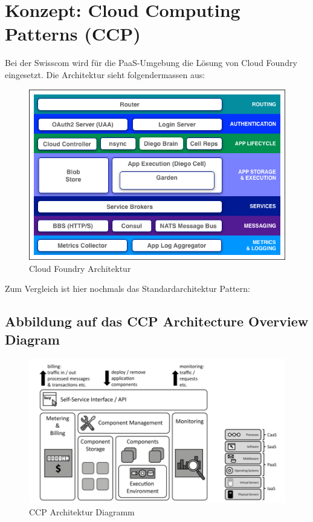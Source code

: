 \chapter{Konzept: Cloud Computing Patterns (CCP)}
Bei der Swisscom wird für die PaaS-Umgebung die Lösung von Cloud Foundry eingesetzt. Die Architektur sieht folgendermassen aus:
\begin{figure}[H]
\centering
\includegraphics[scale=0.45]{images/ccp/cloudfoundry.png}
\caption{Cloud Foundry Architektur}
\end{figure}
Zum Vergleich ist hier nochmals das Standardarchitektur Pattern:
\section{Abbildung auf das CCP Architecture Overview Diagram}
\begin{figure}[H]
\centering
\includegraphics[scale=0.4]{images/ccp/ccp.png}
\caption{CCP Architektur Diagramm}
\end{figure}

